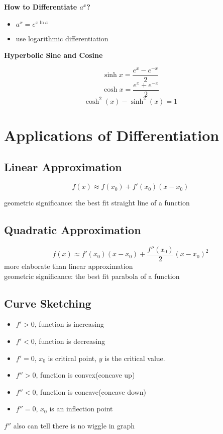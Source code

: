 \documentclass{article}
\begin{document}
\textbf{How to Differentiate $a^x$?}

\begin{itemize}
  \item $a^x = e^{x\ln a}$
  \item use logarithmic differentiation
\end{itemize}

\textbf{Hyperbolic Sine and Cosine}

$$\sinh x = \frac{e^x - e^{-x}}{2}$$
$$\cosh x = \frac{e^x + e^{-x}}{2}$$
$$\cosh ^2(x) - \sinh ^2(x) = 1$$

\section{Applications of Differentiation}
\subsection{Linear Approximation}
$$f(x) \approx f(x_0) + f'(x_0)(x-x_0)$$

geometric significance: the best fit straight line of a function

\subsection{Quadratic Approximation}
$$f(x) \approx f'(x_0)(x-x_0) + \frac{f''(x_0)}{2}(x-x_0)^2$$
more elaborate than linear approximation \\
geometric significance: the best fit parabola of a function

\subsection{Curve Sketching}
\begin{itemize}
  \item $f' > 0$, function is increasing
  \item $f' < 0$, function is decreasing
  \item $f' = 0$, $x_0$ is critical point, $y$ is the critical value.
  \item $f'' > 0$, function is convex(concave up)
  \item $f'' < 0$, function is concave(concave down)
  \item $f'' = 0$, $x_0$ is an inflection point
\end{itemize}

$f''$ also can tell there is no wiggle in graph
\end{document}
